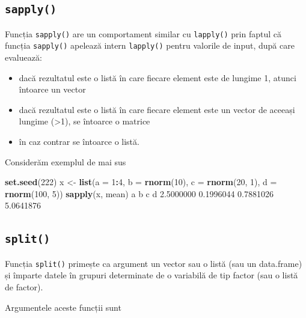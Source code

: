 \documentclass[]{article}
\newenvironment{Shaded}{\begin{snugshade}}{\end{snugshade}}
\newcommand{\KeywordTok}[1]{\textcolor[rgb]{0.13,0.29,0.53}{\textbf{#1}}}
\newcommand{\DataTypeTok}[1]{\textcolor[rgb]{0.13,0.29,0.53}{#1}}
\newcommand{\DecValTok}[1]{\textcolor[rgb]{0.00,0.00,0.81}{#1}}
\newcommand{\FloatTok}[1]{\textcolor[rgb]{0.00,0.00,0.81}{#1}}
\newcommand{\StringTok}[1]{\textcolor[rgb]{0.31,0.60,0.02}{#1}}
\newcommand{\OperatorTok}[1]{\textcolor[rgb]{0.81,0.36,0.00}{\textbf{#1}}}
\newcommand{\NormalTok}[1]{#1}
\newcounter{exo}[section]
\begin{document}
\subsection{\texorpdfstring{\texttt{sapply()}}{sapply()}}\label{sapply}

Funcția \texttt{sapply()} are un comportament similar cu
\texttt{lapply()} prin faptul că funcția \texttt{sapply()} apelează
intern \texttt{lapply()} pentru valorile de input, după care evaluează:

\begin{itemize}
\item
  dacă rezultatul este o listă în care fiecare element este de lungime
  1, atunci întoarce un vector
\item
  dacă rezultatul este o listă în care fiecare element este un vector de
  aceeași lungime (\textgreater{}1), se întoarce o matrice
\item
  în caz contrar se întoarce o listă.
\end{itemize}

Considerăm exemplul de mai sus

\begin{Shaded}
\begin{Highlighting}[]
\KeywordTok{set.seed}\NormalTok{(}\DecValTok{222}\NormalTok{)}
\NormalTok{x <-}\StringTok{ }\KeywordTok{list}\NormalTok{(}\DataTypeTok{a =} \DecValTok{1}\OperatorTok{:}\DecValTok{4}\NormalTok{, }\DataTypeTok{b =} \KeywordTok{rnorm}\NormalTok{(}\DecValTok{10}\NormalTok{), }\DataTypeTok{c =} \KeywordTok{rnorm}\NormalTok{(}\DecValTok{20}\NormalTok{, }\DecValTok{1}\NormalTok{), }\DataTypeTok{d =} \KeywordTok{rnorm}\NormalTok{(}\DecValTok{100}\NormalTok{, }\DecValTok{5}\NormalTok{))}
\KeywordTok{sapply}\NormalTok{(x, mean)}
\NormalTok{        a         b         c         d }
\FloatTok{2.5000000} \FloatTok{0.1996044} \FloatTok{0.7881026} \FloatTok{5.0641876} 
\end{Highlighting}
\end{Shaded}

\subsection{\texorpdfstring{\texttt{split()}}{split()}}\label{split}

Funcția \texttt{split()} primește ca argument un vector sau o listă (sau
un data.frame) și împarte datele în grupuri determinate de o variabilă
de tip factor (sau o listă de factor).

Argumentele aceste funcții sunt
\end{document}
